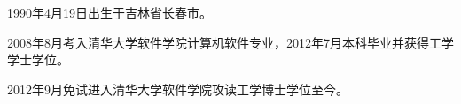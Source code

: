 \begin{resume}


  1990年4月19日出生于吉林省长春市。

  2008年8月考入清华大学软件学院计算机软件专业，2012年7月本科毕业并获得工学学士学位。

  2012年9月免试进入清华大学软件学院攻读工学博士学位至今。



\end{resume}
